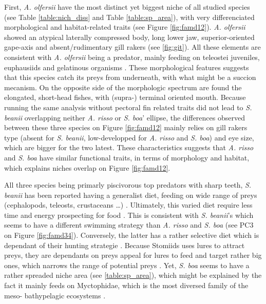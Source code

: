 First, \textit{A. olfersii} have the most distinct yet biggest niche of all studied species (see Table \ref{table:nich_diss} and Table \ref{table:sp_area}), with very differenciated morphological and habitat-related traits (see Figure \ref{fig:famd12}). \textit{A. olfersii} showed an atypical laterally compressed body, long lower jaw, superior-oriented gape-axis and absent/rudimentary gill rakers (see \ref{fig:git}). All these elements are consistent with \textit{A. olfersii} being a predator, mainly feeding on teleostei juveniles, euphausiids and gelatinous organisms \citep{eduardo2020}. These morphological features suggests that this species catch its preys from underneath, with what might be a succion mecanism. On the opposite side of the morphologic spectrum are found the elongated, short-head fishes, with (supra-) terminal oriented mouth. Because running the same analysis without pectoral fin related traits did not lead to \textit{S. beanii} overlapping neither \textit{A. risso} or \textit{S. boa}' ellipse, the differences observed between these three species on Figure \ref{fig:famd12} mainly relies on gill rakers type (absent for \textit{S. beanii}, low-developped for \textit{A. risso} and \textit{S. boa}) and eye size, which are bigger for the two latest. These characteristics suggests that \textit{A. risso} and \textit{S. boa} have similar functional traits, in terms of morphology and habitat, which explains niches overlap on Figure \ref{fig:famd12}. 

All three species being primarly piscivorous top predators with sharp teeth, \textit{S. beanii} has been reported having a generalist diet, feeding on wide range of preys (cephalopods, teleosts, crustaceans \ldots{}) \citep{geidner2008}. Ultimately, this varied diet require less time and energy prospecting for food \citep{geidner2008}. This is consistent with \textit{S. beanii}'s which seems to have a different swimming strategy than \textit{A. risso} and \textit{S. boa} (see PC3 on Figure \ref{fig:famd34}). Conversely, the latter has a rather selective diet which is dependant of their hunting strategie \citep{sutton1996}. Because Stomiids uses lures to attract preys, they are dependants on preys appeal for lures to feed and target rather big ones, which narrows the range of potential preys \citep{geidner2008,germain2019}. Yet, \textit{S. boa} seems to have a rather spreaded niche area (see \ref{table:sp_area}), which might be explained by the fact it mainly feeds on Myctophidae, which is the most diversed family of the meso- bathypelagic ecosystems \citep{garcia2021,sutton1996}. 

